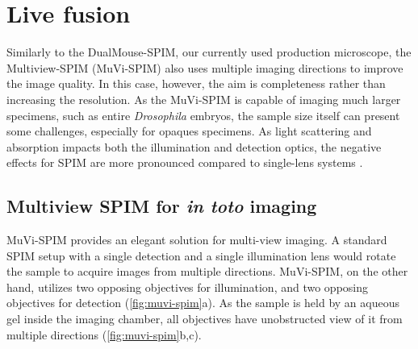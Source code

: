




\section{Live fusion}

Similarly to the DualMouse-SPIM, our currently used production microscope, the Multiview-SPIM (MuVi-SPIM) \cite{krzic_multiview_2012} also uses multiple imaging directions to improve the image quality. In this case, however, the aim is completeness rather than increasing the resolution. As the MuVi-SPIM is capable of imaging much larger specimens, such as entire \textit{Drosophila} embryos, the sample size itself can present some challenges, especially for opaques specimens. As light scattering and absorption impacts both the illumination and detection optics, the negative effects for SPIM are more pronounced compared to single-lens systems \cite{de_medeiros_deep_2016}.




\subsection{Multiview SPIM for \textit{in toto} imaging}

MuVi-SPIM  provides an elegant solution for multi-view imaging. A standard SPIM setup with a single detection and a single illumination lens would rotate the sample to acquire images from multiple directions. MuVi-SPIM, on the other hand, utilizes two opposing objectives for illumination, and two opposing objectives for detection (\autoref{fig:muvi-spim}a). As the sample is held by an aqueous gel inside the imaging chamber, all objectives have unobstructed view of it from multiple directions (\autoref{fig:muvi-spim}b,c).

